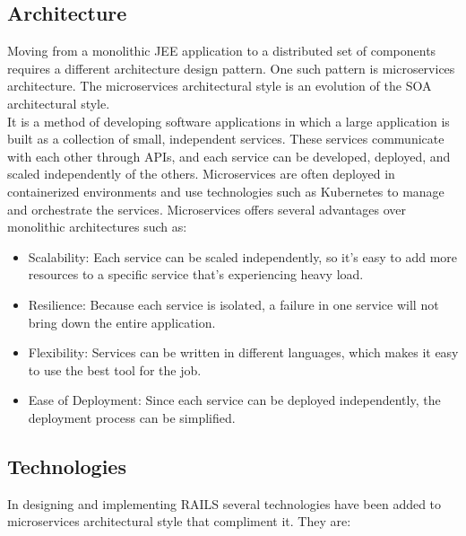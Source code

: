 \subsection{Architecture}
Moving from a monolithic \ac{JEE} application to a distributed set of components requires a different architecture design pattern. One such pattern is microservices architecture. The microservices architectural style is an evolution of the \ac{SOA} architectural style.\vspace{5mm} \\
It is a method of developing software applications in which a large application is built as a collection of small, independent services. These services communicate with each other through APIs, and each service can be developed, deployed, and scaled independently of the others. Microservices are often deployed in containerized environments and use technologies such as Kubernetes to manage and orchestrate the services. Microservices offers several advantages over monolithic architectures such as:
\begin{itemize}
\item Scalability: Each service can be scaled independently, so it's easy to add more resources to a specific service that's experiencing heavy load.
\item Resilience: Because each service is isolated, a failure in one service will not bring down the entire application.
\item Flexibility: Services can be written in different languages, which makes it easy to use the best tool for the job.
\item Ease of Deployment: Since each service can be deployed independently, the deployment process can be simplified.
\end{itemize}
\subsection{Technologies}
In designing and implementing \ac{RAILS} several technologies have been added to microservices architectural style that compliment it. They are:
